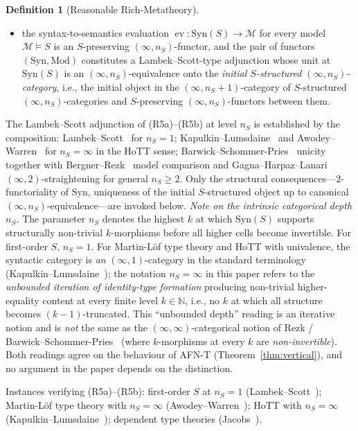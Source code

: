 \documentclass[11pt]{article}
\theoremstyle{plain}
\theoremstyle{definition}
\newtheorem{definition}[theorem]{Definition}
\newcommand{\cM}{\mathcal{M}}
\newcommand{\Syn}{\mathrm{Syn}}
\newcommand{\Mod}{\mathrm{Mod}}
\DeclareMathOperator{\ev}{ev}
\begin{document}
\begin{definition}[Reasonable Rich-Metatheory]
\begin{itemize}
\begin{itemize}
\item[\textbf{(R5b)}] the syntax-to-semantics evaluation $\ev : \Syn(S) \to \cM$ for every model $\cM \models S$ is an $S$-preserving $(\infty, n_S)$-functor, and the pair of functors $(\Syn, \Mod)$ constitutes a Lambek--Scott-type adjunction whose unit at $\Syn(S)$ is an $(\infty, n_S)$-equivalence onto the \emph{initial $S$-structured $(\infty, n_S)$-category}, i.e., the initial object in the $(\infty, n_S + 1)$-category of $S$-structured $(\infty, n_S)$-categories and $S$-preserving $(\infty, n_S)$-functors between them.
\end{itemize}
The Lambek--Scott adjunction of (R5a)--(R5b) at level $n_S$ is established by the composition: Lambek--Scott~\cite{LambekScott1986} for $n_S = 1$; Kapulkin--Lumsdaine~\cite{KapulkinLumsdaine2021} and Awodey--Warren~\cite{AwodeyWarren2009} for $n_S = \infty$ in the HoTT sense; Barwick--Schommer-Pries~\cite{BarwickSchommerPries2021} unicity together with Bergner--Rezk~\cite{BergnerRezk2013} model comparison and Gagna--Harpaz--Lanari~\cite{GagnaHarpazLanari2021} $(\infty, 2)$-straightening for general $n_S \geq 2$. Only the structural consequences---$2$-functoriality of $\Syn$, uniqueness of the initial $S$-structured object up to canonical $(\infty, n_S)$-equivalence---are invoked below.
\emph{Note on the intrinsic categorical depth $n_S$.} The parameter $n_S$ denotes the highest $k$ at which $\Syn(S)$ supports structurally non-trivial $k$-morphisms before all higher cells become invertible. For first-order $S$, $n_S = 1$. For Martin-L\"of type theory and HoTT with univalence, the syntactic category is \emph{an} $(\infty, 1)$-category in the standard terminology (Kapulkin--Lumsdaine~\cite{KapulkinLumsdaine2021}); the notation $n_S = \infty$ in this paper refers to the \emph{unbounded iteration of identity-type formation} producing non-trivial higher-equality content at every finite level $k \in \mathbb{N}$, i.e., no $k$ at which all structure becomes $(k-1)$-truncated. This ``unbounded depth'' reading is an iterative notion and is \emph{not} the same as the $(\infty, \infty)$-categorical notion of Rezk / Barwick--Schommer-Pries~\cite{BarwickSchommerPries2021} (where $k$-morphisms at every $k$ are \emph{non-invertible}). Both readings agree on the behaviour of AFN-T (Theorem~\ref{thm:vertical}), and no argument in the paper depends on the distinction.

Instances verifying (R5a)--(R5b): first-order $S$ at $n_S = 1$ (Lambek--Scott~\cite{LambekScott1986}); Martin-L\"of type theory with $n_S = \infty$ (Awodey--Warren~\cite{AwodeyWarren2009}); HoTT with $n_S = \infty$ (Kapulkin--Lumsdaine~\cite{KapulkinLumsdaine2021}); dependent type theories (Jacobs~\cite{Jacobs1999}).
\end{itemize}
\end{definition}
\end{document}
